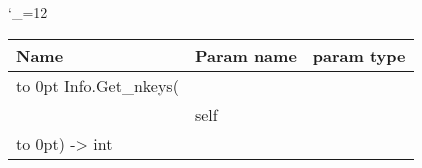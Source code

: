 \begingroup \catcode`\_=12 \tt
\begin{tabular}{lll}
\toprule
\textrm{Name}&\textrm{Param name}&\textrm{param type}\\
\midrule
\hbox to 0pt {Info.Get_nkeys(\hss}\\
& self\\
\hbox to 0pt{) -> int\hss}\\
\bottomrule
\end{tabular}
\endgroup
